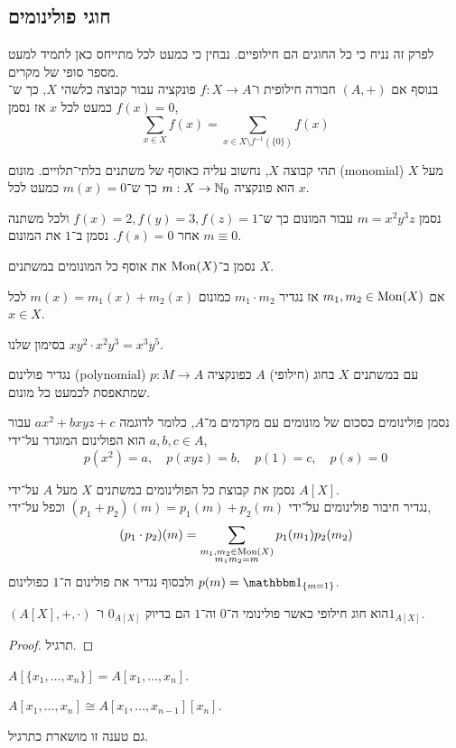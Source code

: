 \subsection{חוגי פולינומים}
לפרק זה נניח כי כל החוגים הם חילופיים.
נבחין כי כמעט לכל מתייחס כאן לתמיד למעט מספר סופי של מקרים. \\
בנוסף אם $(A, +)$ חבורה חילופית ו־$f : X \to A$ פונקציה עבור קבוצה כלשהי $X$, כך ש־$f(x) = 0$ כמעט לכל $x$ אז נסמן,
\[
	\sum_{x \in X} f(x)
	= \sum_{x \in X \setminus f^{-1}(\{ 0 \})} f(x)
\]
\begin{definition}[מונום]
	תהי קבוצה $X$, נחשוב עליה כאוסף של משתנים בלתי־תלויים.
	מונום (monomial) מעל $X$ הוא פונקציה $m : X \to \mathbb{N}_0$ כך ש־$m(x) = 0$ כמעט לכל $x$.
\end{definition}
נסמן $m = x^2 y^3 z$ עבור המונום כך ש־$f(x) = 2, f(y) = 3, f(z) = 1$ ולכל משתנה אחר $f(s) = 0$.
נסמן ב־$1$ את המונום $m \equiv 0$.
\begin{notation}
	נסמן ב־$\operatorname{Mon}(X)$ את אוסף כל המונומים במשתנים $X$.
\end{notation}
\begin{definition}
	אם $m_1, m_2 \in \operatorname{Mon}(X)$ אז נגדיר $m_1 \cdot m_2$ כמונום $m(x) = m_1(x) + m_2(x)$ לכל $x \in X$.
\end{definition}
\begin{example}
	בסימון שלנו $x y^2 \cdot x^2 y^3 = x^3 y^5$.
\end{example}
\begin{definition}[פולינום]
	נגדיר פולינום (polynomial) עם במשתנים $X$ בחוג (חילופי) $A$ כפונקציה $p : M \to A$ שמתאפסת לכמעט כל מונום.
\end{definition}
\begin{notation}
	נסמן פולינומים כסכום של מונומים עם מקדמים מ־$A$, כלומר לדוגמה $a x^2 + b x y z + c$ עבור $a, b, c \in A$ הוא הפולינום המוגדר על־ידי,
	\[
		p(x^2) = a,
		\quad
		p(x y z) = b,
		\quad
		p(1) = c,
		\quad
		p(s) = 0
	\]
\end{notation}
\begin{definition}
	נסמן את קבוצת כל הפולינומים במשתנים $X$ מעל $A$ על־ידי $A[X]$. \\
	נגדיר חיבור פולינומים על־ידי $(p_1 + p_2)(m) = p_1(m) + p_2(m)$ וכפל על־ידי,
	\[
		(p_1 \cdot p_2)(m)
		= \sum_{\substack{m_1, m_2 \in \operatorname{Mon}(X) \\ m_1 m_2 = m}} p_1(m_1) p_2(m_2)
	\]
	ולבסוף נגדיר את פולינום ה־$1$ כפולינום $p(m) = \indicator_{\{ m = 1 \}}$.
\end{definition}
\begin{proposition}
	$(A[X], +, \cdot)$ הוא חוג חילופי כאשר פולינומי ה־$0$ וה־$1$ הם בדיוק $0_{A[X]}$ ו־$1_{A[X]}$.
\end{proposition}
\begin{proof}
	תרגיל.
\end{proof}
\begin{notation}
	$A[\{ x_1, \ldots, x_n \}] = A[x_1, \ldots, x_n]$.
\end{notation}
\begin{proposition}
	$A[x_1, \ldots, x_n] \cong A[x_1, \ldots, x_{n - 1}][x_n]$.
\end{proposition}
גם טענה זו מושארת כתרגיל.

